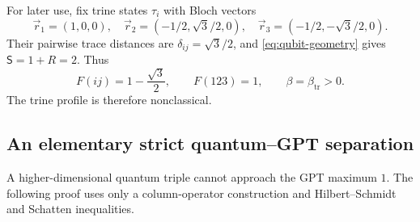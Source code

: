 \documentclass[a4paper,11pt,onecolumn,unpublished]{quantumarticle}
\theoremstyle{definition}
\newcommand{\1}{\mathbf 1}
\newcommand{\Sopt}{\mathsf S}
\newcommand{\btr}{\beta_{\mathrm{tr}}}
\begin{document}
For later use, fix trine states $\tau_i$ with Bloch vectors
\begin{equation}\label{eq:trine-vectors}
 \vec r_1=(1,0,0),\quad
 \vec r_2=(-1/2,\sqrt3/2,0),\quad
 \vec r_3=(-1/2,-\sqrt3/2,0).
\end{equation}
Their pairwise trace distances are $\delta_{ij}=\sqrt3/2$, and
\eqref{eq:qubit-geometry} gives $\Sopt=1+R=2$. Thus
\begin{equation}\label{eq:trine-profile}
 F(ij)=1-\frac{\sqrt3}{2},\qquad F(123)=1,\qquad
 \beta=\btr>0.
\end{equation}
The trine profile is therefore nonclassical.

\subsection{An elementary strict quantum--GPT separation}

A higher-dimensional quantum triple cannot approach the GPT maximum $1$.
The following proof uses only a column-operator construction and
Hilbert--Schmidt and Schatten inequalities.
\end{document}
